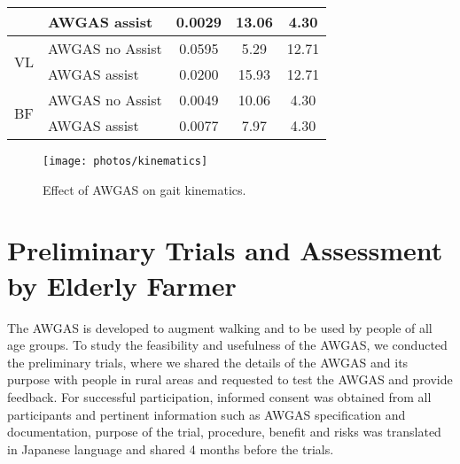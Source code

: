\documentclass[paper,JRM,paper]{jaciiiarticle}
\begin{document}
\begin{table}[h]
{\begin{tabular}{@{}llccc@{}}
		& AWGAS assist                   & 0.0029  & 13.06   & 4.30                                                           \\ \midrule
		\multirow{2}{*}{VL}  & AWGAS no Assist                & 0.0595  & 5.29    & 12.71                                                          \\ 
		& AWGAS assist                   & 0.0200  & 15.93   & 12.71                                                          \\ \midrule
		\multirow{2}{*}{BF}  & AWGAS no Assist                & 0.0049  & 10.06   & 4.30                                                           \\ 
		& AWGAS assist                   & 0.0077  & 7.97    & 4.30                                                           \\ \bottomrule
	\end{tabular}
	}

	\label{ttestresult}
\end{table}

\begin{figure}
	\centering
	\texttt{[image: photos/kinematics]}
	\caption{Effect of AWGAS on gait kinematics. }
	\label{fig:kinematics}
\end{figure}


\section{Preliminary Trials and Assessment by Elderly Farmer}

The AWGAS is developed to augment walking and to be used by people of all age groups. To study the feasibility and usefulness of the AWGAS, we conducted the preliminary trials, where we shared the details of the AWGAS and its purpose with people in rural areas and requested to test the AWGAS and provide feedback. For successful participation, informed consent was obtained from all participants and pertinent information such as AWGAS specification and documentation, purpose of the trial, procedure, benefit and risks was translated in Japanese language and shared 4 months before the trials. 
\end{document}
